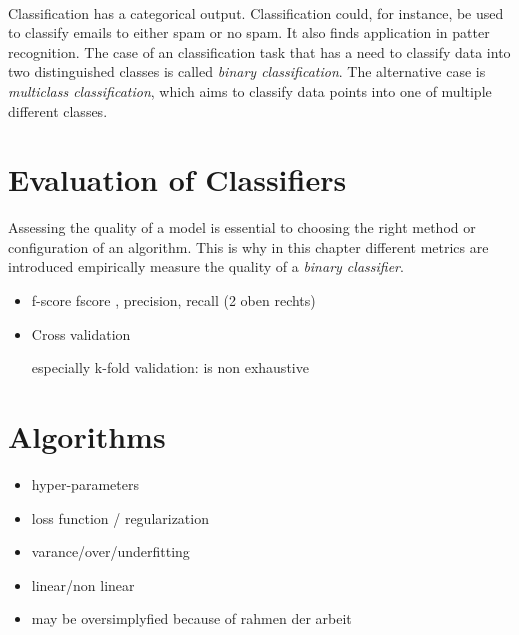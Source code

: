 \\
Classification has a categorical output. Classification could, for instance, be used to classify emails to either spam or no spam. It also finds application in patter recognition. %
The case of an classification task that has a need to classify data into two distinguished classes is called \emph{binary classification}. The alternative case is \emph{multiclass classification}, which aims to classify data points into one of multiple different classes.


\section{Evaluation of Classifiers}
Assessing the quality of a model is essential to choosing the right method or configuration of an algorithm. This is why in this chapter different metrics are introduced empirically  measure the quality of a \emph{binary classifier}.
 
\begin{itemize}
\item{f-score}
fscore , precision, recall
(2 oben rechts)
\item{Cross validation}

especially k-fold validation: 
is non exhaustive


\end{itemize}
\section{Algorithms}
\begin{itemize}
\item{hyper-parameters}
\item{loss function / regularization}
\item{varance/over/underfitting}
\item{linear/non linear}
\item{may be oversimplyfied because of rahmen der arbeit}
\end{itemize}
